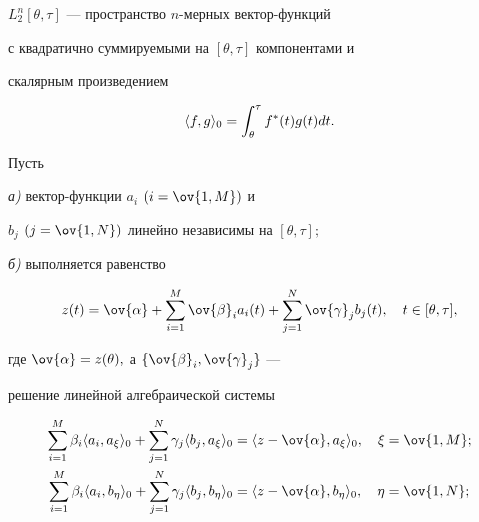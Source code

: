 $L^n_2[\theta,\tau]$ --- пространство $n$-мерных вектор-функций


с квадратично суммируемыми на $[\theta,\tau]$ компонентами и


скалярным произведением


$$


\la f,g\ra_0


= \int_{\theta}^{\tau} f^*(t) g(t) dt.


$$





\begin{thm} Пусть





{\em а)} вектор-функции $a_i$ $(i=\ov{1,M})$ и


$b_j$ $(j=\ov{1,N})$ линейно независимы на $[\theta,\tau];$





{\em б)} выполняется равенство


\begin{equation}


z(t) = \ov{\alpha} + \sum_{i=1}^M \ov{\beta}_i a_i(t) +


\sum_{j=1}^N \ov{\gamma}_j b_j(t),\quad t\in[\theta,\tau],


\end{equation}


где $\ov{\alpha}=z(\theta),$ а $\{\ov{\beta}_i,\ov{\gamma}_j\}$ ---


решение линейной алгебраической системы


\begin{equation}


\begin{split}


\sum_{i=1}^M \beta_i\la a_i,a_{\xi}\ra_0 +


\sum_{j=1}^N\gamma_j\la b_j,a_{\xi}\ra_0 &=


\la z-\ov{\alpha},a_{\xi}\ra_0,\quad \xi=\ov{1,M};\\


%


\sum_{i=1}^M \beta_i\la a_i,b_{\eta}\ra_0 +


\sum_{j=1}^N\gamma_j\la b_j,b_{\eta}\ra_0 &=


\la z-\ov{\alpha},b_{\eta}\ra_0, \quad \eta=\ov{1,N};


\end{split}



\end{equation}
\end{thm}

